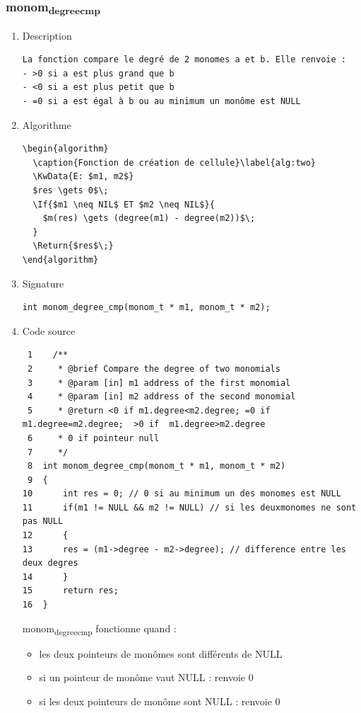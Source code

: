 \documentclass[11pt]{article}
\begin{document}
\subsubsection{monom\textsubscript{degree}\textsubscript{cmp}}
\label{sec:orgac324bb}
\begin{enumerate}
\item Description
\label{sec:org3b81683}

\begin{verbatim}
La fonction compare le degré de 2 monomes a et b. Elle renvoie :
- >0 si a est plus grand que b
- <0 si a est plus petit que b
- =0 si a est égal à b ou au minimum un monôme est NULL
\end{verbatim}

\item Algorithme
\label{sec:org072d3be}

\begin{verbatim}
\begin{algorithm}
  \caption{Fonction de création de cellule}\label{alg:two}
  \KwData{E: $m1, m2$}
  $res \gets 0$\;
  \If{$m1 \neq NIL$ ET $m2 \neq NIL$}{
    $m(res) \gets (degree(m1) - degree(m2))$\;
  }
  \Return{$res$\;}
\end{algorithm}
\end{verbatim}

\item Signature
\label{sec:org024df4b}

\begin{verbatim}
int monom_degree_cmp(monom_t * m1, monom_t * m2);
\end{verbatim}

\item Code source
\label{sec:org8619f6b}

\begin{verbatim}
 1    /**
 2     * @brief Compare the degree of two monomials
 3     * @param [in] m1 address of the first monomial
 4     * @param [in] m2 address of the second monomial
 5     * @return <0 if m1.degree<m2.degree; =0 if m1.degree=m2.degree;  >0 if  m1.degree>m2.degree
 6     * 0 if pointeur null
 7     */
 8  int monom_degree_cmp(monom_t * m1, monom_t * m2)
 9  {
10      int res = 0; // 0 si au minimum un des monomes est NULL
11      if(m1 != NULL && m2 != NULL) // si les deuxmonomes ne sont pas NULL
12      { 
13  	res = (m1->degree - m2->degree); // difference entre les deux degres
14      }
15      return res;
16  }
\end{verbatim}
monom\textsubscript{degree}\textsubscript{cmp} fonctionne quand :
\begin{itemize}
\item les deux pointeurs de monômes sont différents de NULL
\item si un pointeur de monôme vaut NULL : renvoie 0
\item si les deux pointeurs de monôme sont NULL : renvoie 0
\end{itemize}


\end{enumerate}
\end{document}
